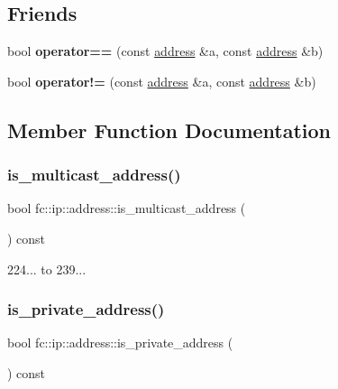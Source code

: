 \subsection*{Friends}
\begin{DoxyCompactItemize}
\item 
\mbox{\label{classfc_1_1ip_1_1address_aa0feacee1993c1338d13ea41f236d660}} 
bool {\bfseries operator==} (const \mbox{\hyperlink{classfc_1_1ip_1_1address}{address}} \&a, const \mbox{\hyperlink{classfc_1_1ip_1_1address}{address}} \&b)
\item 
\mbox{\label{classfc_1_1ip_1_1address_a259e8078e0b2dc8015bf497b96c2a1a2}} 
bool {\bfseries operator!=} (const \mbox{\hyperlink{classfc_1_1ip_1_1address}{address}} \&a, const \mbox{\hyperlink{classfc_1_1ip_1_1address}{address}} \&b)
\end{DoxyCompactItemize}


\subsection{Member Function Documentation}
\mbox{\label{classfc_1_1ip_1_1address_a7365faef59d2df42310b3d68f62f61e4}} 
\subsubsection{\texorpdfstring{is\+\_\+multicast\+\_\+address()}{is\_multicast\_address()}}
{\footnotesize\ttfamily bool fc\+::ip\+::address\+::is\+\_\+multicast\+\_\+address (\begin{DoxyParamCaption}{ }\end{DoxyParamCaption}) const}

224... to 239... \mbox{\label{classfc_1_1ip_1_1address_a0fd7da64e9de2fc54b5dc537dad7aee2}} 
\subsubsection{\texorpdfstring{is\+\_\+private\+\_\+address()}{is\_private\_address()}}
{\footnotesize\ttfamily bool fc\+::ip\+::address\+::is\+\_\+private\+\_\+address (\begin{DoxyParamCaption}{ }\end{DoxyParamCaption}) const}

